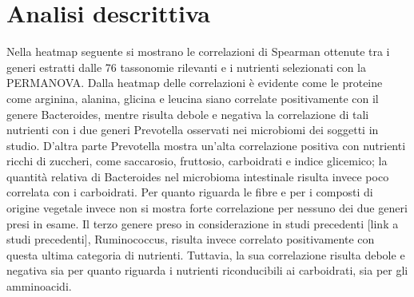 \section{Analisi descrittiva}
Nella heatmap seguente si mostrano le correlazioni di Spearman ottenute tra i generi estratti dalle 76 tassonomie rilevanti e i nutrienti selezionati con la PERMANOVA. 
Dalla heatmap delle correlazioni è evidente come le proteine come arginina, alanina, glicina e leucina siano correlate positivamente con il genere Bacteroides, mentre risulta debole e negativa la correlazione di tali nutrienti con i due generi Prevotella osservati nei microbiomi dei soggetti in studio. D’altra parte Prevotella mostra un'alta correlazione positiva con nutrienti ricchi di zuccheri, come saccarosio, fruttosio, carboidrati e indice glicemico; la quantità relativa di Bacteroides nel microbioma intestinale risulta invece poco correlata con i carboidrati. Per quanto riguarda le fibre e per i composti di origine vegetale invece non si mostra forte correlazione per nessuno dei due generi presi in esame. Il terzo genere preso in considerazione in studi precedenti [link a studi precedenti], Ruminococcus, risulta invece correlato positivamente con questa ultima categoria di nutrienti. Tuttavia, la sua correlazione risulta debole e negativa sia per quanto riguarda i nutrienti riconducibili ai carboidrati, sia per gli amminoacidi.
\\
